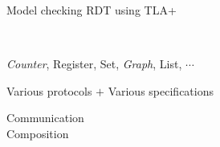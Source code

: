 
\begin{frame}{}
  \begin{center}
    {\large {} Model checking RDT using TLA+} \\[5pt] \pause

     \\[15pt] \pause

    \textsl{Counter}, Register, Set, \textsl{Graph}, List, $\cdots$ \\[15pt] \pause

    Various protocols $+$ Various specifications
  \end{center}
\end{frame}

\begin{frame}{}
  \centerline{}


  \begin{center}
    Communication \\[6pt]
    Composition 
  \end{center}
\end{frame}
